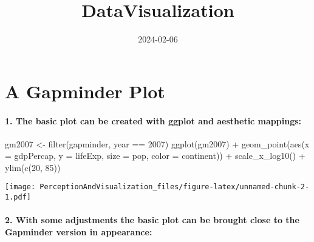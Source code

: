\documentclass[
]{article}
\title{DataVisualization}
\author{}
\date{\vspace{-2.5em}2024-02-06}
\newenvironment{Shaded}{\begin{snugshade}}{\end{snugshade}}
\newcommand{\AttributeTok}[1]{\textcolor[rgb]{0.77,0.63,0.00}{#1}}
\newcommand{\DecValTok}[1]{\textcolor[rgb]{0.00,0.00,0.81}{#1}}
\newcommand{\FunctionTok}[1]{\textcolor[rgb]{0.00,0.00,0.00}{#1}}
\newcommand{\NormalTok}[1]{#1}
\newcommand{\OtherTok}[1]{\textcolor[rgb]{0.56,0.35,0.01}{#1}}
\newcommand{\SpecialCharTok}[1]{\textcolor[rgb]{0.00,0.00,0.00}{#1}}
\begin{document}
\maketitle

\hypertarget{a-gapminder-plot}{%
\section{A Gapminder Plot}\label{a-gapminder-plot}}

\hypertarget{the-basic-plot-can-be-created-with-ggplot-and-aesthetic-mappings}{%
\paragraph{1. The basic plot can be created with ggplot and aesthetic
mappings:}\label{the-basic-plot-can-be-created-with-ggplot-and-aesthetic-mappings}}

\begin{Shaded}
\begin{Highlighting}[]
\NormalTok{gm2007 }\OtherTok{\textless{}{-}} \FunctionTok{filter}\NormalTok{(gapminder, year }\SpecialCharTok{==} \DecValTok{2007}\NormalTok{)}
\FunctionTok{ggplot}\NormalTok{(gm2007) }\SpecialCharTok{+}
  \FunctionTok{geom\_point}\NormalTok{(}\FunctionTok{aes}\NormalTok{(}\AttributeTok{x =}\NormalTok{ gdpPercap,}
                 \AttributeTok{y =}\NormalTok{ lifeExp,}
                 \AttributeTok{size =}\NormalTok{ pop,}
                 \AttributeTok{color =}\NormalTok{ continent)) }\SpecialCharTok{+}
  \FunctionTok{scale\_x\_log10}\NormalTok{() }\SpecialCharTok{+}
  \FunctionTok{ylim}\NormalTok{(}\FunctionTok{c}\NormalTok{(}\DecValTok{20}\NormalTok{, }\DecValTok{85}\NormalTok{))}
\end{Highlighting}
\end{Shaded}

\texttt{[image: PerceptionAndVisualization\_files/figure-latex/unnamed-chunk-2-1.pdf]}

\hypertarget{with-some-adjustments-the-basic-plot-can-be-brought-close-to-the-gapminder-version-in-appearance}{%
\paragraph{2. With some adjustments the basic plot can be brought close
to the Gapminder version in
appearance:}\label{with-some-adjustments-the-basic-plot-can-be-brought-close-to-the-gapminder-version-in-appearance}}
\end{document}
